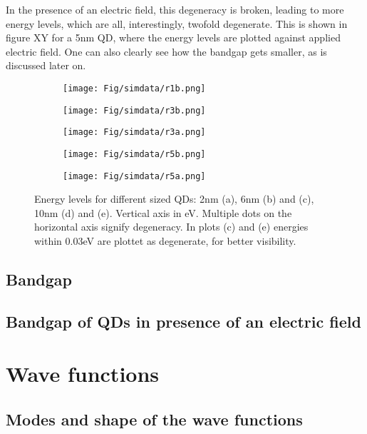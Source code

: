 In the presence of an electric field, this degeneracy is broken, leading to more energy levels, which are all, interestingly, twofold degenerate. This is shown in figure XY for a 5nm QD, where the energy levels are plotted against applied electric field. One can also clearly see how the bandgap gets smaller, as is discussed later on.
\begin{figure}
	\begin{center} 
	\begin{subfigure}{60px}
		\texttt{[image: Fig/simdata/r1b.png]}
		\caption{}
	\end{subfigure}    
	\begin{subfigure}{60px}
		\texttt{[image: Fig/simdata/r3b.png]}
		\caption{}
	\end{subfigure}
	\begin{subfigure}{60px}
		\texttt{[image: Fig/simdata/r3a.png]}
		\caption{}
	\end{subfigure}
	\begin{subfigure}{60px}
		\texttt{[image: Fig/simdata/r5b.png]}
		\caption{}
	\end{subfigure}    
	\begin{subfigure}{60px}
		\texttt{[image: Fig/simdata/r5a.png]}
		\caption{}
	\end{subfigure}
	\end{center}
	\caption{Energy levels for different sized QDs: 2nm (a), 6nm (b) and (c), 10nm (d) and (e). Vertical axis in eV. Multiple dots on the horizontal axis signify degeneracy. In plots (c) and (e) energies within 0.03eV are plottet as degenerate, for better visibility.}
\end{figure}
\FloatBarrier
\subsection{Bandgap} 

\subsection{Bandgap of QDs in presence of an electric field}

\section{Wave functions}

\subsection{Modes and shape of the wave functions}
